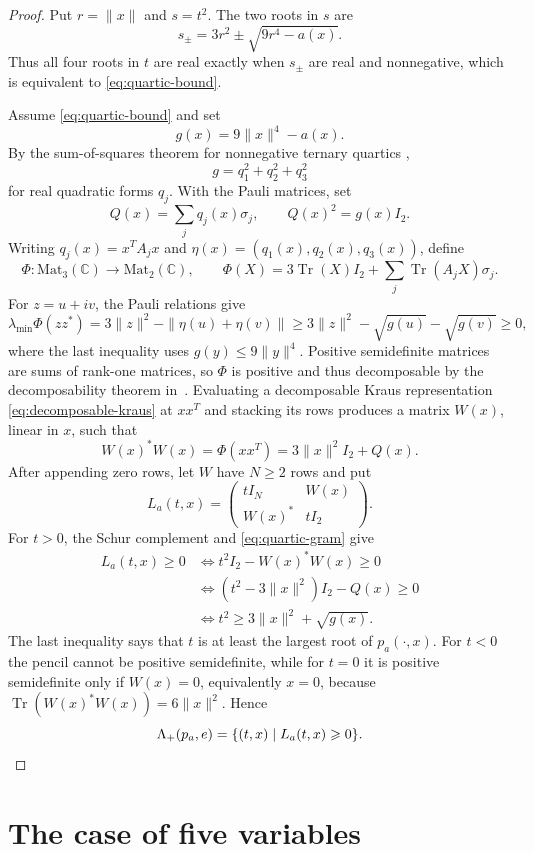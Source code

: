 \documentclass[11pt,onecolumn]{article}
\theoremstyle{blueplain}
\theoremstyle{bluedefinition}
\theoremstyle{bluedefinition}
\newcommand{\C}{\mathbb C}
\newcommand{\M}{\mathrm{Mat}}
\newcommand{\Tr}{\operatorname{Tr}}
\begin{document}
\begin{proof}
Put $r=\|x\|$ and $s=t^2$. The two roots in $s$ are
\[
s_\pm=3r^2\pm\sqrt{9r^4-a(x)}.
\]
Thus all four roots in $t$ are real exactly when $s_\pm$ are real and
nonnegative, which is equivalent to \eqref{eq:quartic-bound}.

Assume \eqref{eq:quartic-bound} and set
\[
g(x)=9\|x\|^4-a(x).
\]
By the sum-of-squares theorem for nonnegative ternary quartics
\cite{Hilbert},
\[
g=q_1^2+q_2^2+q_3^2
\]
for real quadratic forms $q_j$. With the Pauli matrices, set
\[
Q(x)=\sum_jq_j(x)\sigma_j,\qquad
Q(x)^2=g(x)I_2.
\]
Writing $q_j(x)=x^TA_jx$ and
$\eta(x)=(q_1(x),q_2(x),q_3(x))$, define
\[
\Phi\colon \M_3(\C)\to \M_2(\C),\qquad
\Phi(X)=3\Tr(X)I_2+\sum_j\Tr(A_jX)\sigma_j.
\]
For $z=u+iv$, the Pauli relations give
\[
\lambda_{\min}\Phi(zz^*)
=
3\|z\|^2-\|\eta(u)+\eta(v)\|
\geqslant
3\|z\|^2-\sqrt{g(u)}-\sqrt{g(v)}
\geqslant0,
\]
where the last inequality uses $g(y)\leqslant9\|y\|^4$. Positive semidefinite
matrices are sums of rank-one matrices, so $\Phi$ is positive and thus decomposable by
the decomposability theorem in~\cite{Woronowicz}.   Evaluating a
decomposable Kraus representation \eqref{eq:decomposable-kraus} at $xx^T$
and stacking its rows produces a matrix $W(x)$, linear in $x$, such that
\begin{equation}\label{eq:quartic-gram}
W(x)^*W(x)
=
\Phi(xx^T)
=3\|x\|^2I_2+Q(x).
\end{equation}
After appending zero rows, let $W$ have $N\geqslant2$ rows and put
\[
L_a(t,x)=
\begin{pmatrix}
tI_N&W(x)\\
W(x)^*&tI_2
\end{pmatrix}.
\]
For $t>0$, the Schur complement and \eqref{eq:quartic-gram} give
\begin{align*}
L_a(t,x)\geqslant0
&\Longleftrightarrow
t^2I_2-W(x)^*W(x)\geqslant0
\\
&\Longleftrightarrow
(t^2-3\|x\|^2)I_2-Q(x)\geqslant0
\\
&\Longleftrightarrow
t^2\geqslant3\|x\|^2+\sqrt{g(x)}.
\end{align*}
The last inequality says that $t$ is at least the largest root of
$p_a(\cdot,x)$. For $t<0$ the pencil cannot be positive semidefinite, while
for $t=0$ it is positive semidefinite only if $W(x)=0$, equivalently $x=0$,
because $\Tr(W(x)^*W(x))=6\|x\|^2$. Hence
\[
\Lambda_+(p_a,e)
=
\{(t,x)\mid L_a(t,x)\geqslant0\}.\qedhere
\]
\end{proof}

\section{The case of five variables}\label{sec:five-variables}
\end{document}
